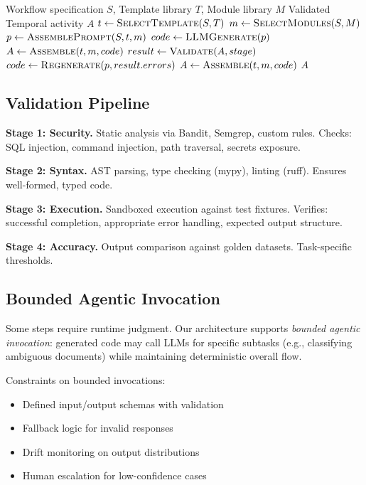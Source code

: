 \documentclass[11pt]{article}
\begin{document}
\begin{algorithm}[ht]
\caption{Code Foundry Generation Process}
\label{alg:generation}
\begin{algorithmic}[1]
\Require Workflow specification $S$, Template library $T$, Module library $M$
\Ensure Validated Temporal activity $A$
\State $t \gets \textsc{SelectTemplate}(S, T)$
\State $m \gets \textsc{SelectModules}(S, M)$
\State $p \gets \textsc{AssemblePrompt}(S, t, m)$
\State $code \gets \textsc{LLMGenerate}(p)$ 
\State $A \gets \textsc{Assemble}(t, m, code)$
    \State $result \gets \textsc{Validate}(A, stage)$
        \State $code \gets \textsc{Regenerate}(p, result.errors)$
        \State $A \gets \textsc{Assemble}(t, m, code)$
    \EndIf
\EndFor
\State \Return $A$ 
\end{algorithmic}
\end{algorithm}

\subsection{Validation Pipeline}

\textbf{Stage 1: Security.} Static analysis via Bandit, Semgrep, custom rules. Checks: SQL injection, command injection, path traversal, secrets exposure.

\textbf{Stage 2: Syntax.} AST parsing, type checking (mypy), linting (ruff). Ensures well-formed, typed code.

\textbf{Stage 3: Execution.} Sandboxed execution against test fixtures. Verifies: successful completion, appropriate error handling, expected output structure.

\textbf{Stage 4: Accuracy.} Output comparison against golden datasets. Task-specific thresholds.

\subsection{Bounded Agentic Invocation}

Some steps require runtime judgment. Our architecture supports \textit{bounded agentic invocation}: generated code may call LLMs for specific subtasks (e.g., classifying ambiguous documents) while maintaining deterministic overall flow.

Constraints on bounded invocations:
\begin{itemize}
    \item Defined input/output schemas with validation
    \item Fallback logic for invalid responses
    \item Drift monitoring on output distributions
    \item Human escalation for low-confidence cases
\end{itemize}
\end{document}
